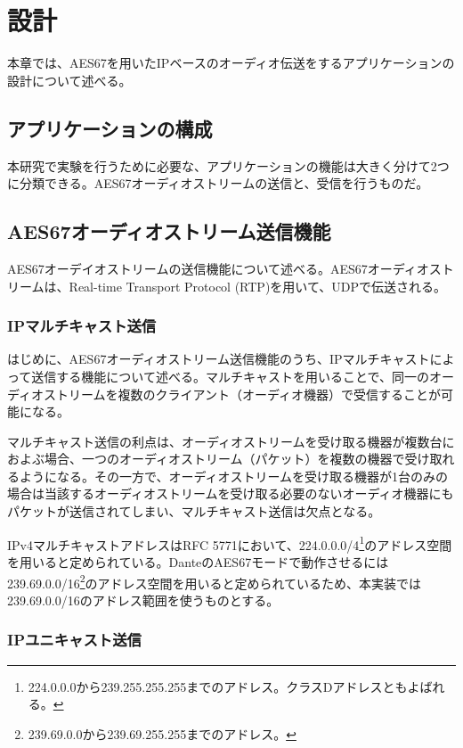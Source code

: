 \chapter{設計}
\label{chap:design}

本章では、AES67を用いたIPベースのオーディオ伝送をするアプリケーションの設計について述べる。

\section{アプリケーションの構成}

本研究で実験を行うために必要な、アプリケーションの機能は大きく分けて2つに分類できる。AES67オーディオストリームの送信と、受信を行うものだ。

\section{AES67オーディオストリーム送信機能}

AES67オーデイオストリームの送信機能について述べる。AES67オーディオストリームは、Real-time Transport Protocol (RTP)\cite{rfc3550}\cite{rfc3551}を用いて、UDPで伝送される。

\subsection{IPマルチキャスト送信}

はじめに、AES67オーディオストリーム送信機能のうち、IPマルチキャストによって送信する機能について述べる。マルチキャストを用いることで、同一のオーディオストリームを複数のクライアント（オーディオ機器）で受信することが可能になる。

マルチキャスト送信の利点は、オーディオストリームを受け取る機器が複数台におよぶ場合、一つのオーディオストリーム（パケット）を複数の機器で受け取れるようになる。その一方で、オーディオストリームを受け取る機器が1台のみの場合は当該するオーディオストリームを受け取る必要のないオーディオ機器にもパケットが送信されてしまい、マルチキャスト送信は欠点となる。

IPv4マルチキャストアドレスはRFC 5771\cite{rfc5771}において、224.0.0.0/4\footnote{224.0.0.0から239.255.255.255までのアドレス。クラスDアドレスともよばれる。}のアドレス空間を用いると定められている。DanteのAES67モードで動作させるには239.69.0.0/16\footnote{239.69.0.0から239.69.255.255までのアドレス。}のアドレス空間を用いると定められているため、本実装では239.69.0.0/16のアドレス範囲を使うものとする。

\subsection{IPユニキャスト送信}

